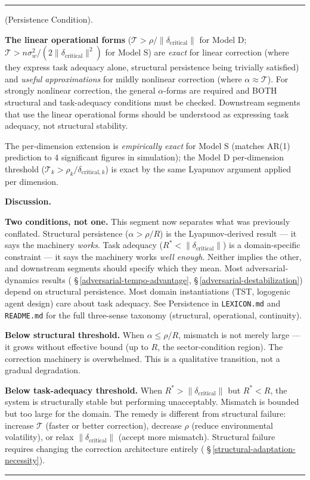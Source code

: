 \documentclass[11pt,oneside]{article}
\newcounter{claim}[section]
\renewcommand{\theclaim}{\thesection.\arabic{claim}}
\newenvironment{segment}[2]{%
  \refstepcounter{claim}%
  \bigskip\noindent\hrule\smallskip
  \noindent{\bfseries #1~\theclaim}\enskip(#2).\par\smallskip
  \noindent\ignorespaces
}{%
  \par\smallskip\noindent\hrule\bigskip
}
\newenvironment{theorem}[1][]{\begin{segment}{Theorem}{#1}}{\end{segment}}
\begin{document}
\begin{theorem}[Persistence Condition]
\textbf{The linear operational forms} ($\mathcal{T} > \rho/\lVert\delta_{\text{critical}}\rVert$ for Model D; $\mathcal{T} > n\sigma_w^2/(2\lVert\delta_{\text{critical}}\rVert^2)$ for Model S) are \textit{exact} for linear correction (where they express task adequacy alone, structural persistence being trivially satisfied) and \textit{useful approximations} for mildly nonlinear correction (where $\alpha \approx \mathcal{T}$). For strongly nonlinear correction, the general $\alpha$-forms are required and BOTH structural and task-adequacy conditions must be checked. Downstream segments that use the linear operational forms should be understood as expressing task adequacy, not structural stability.

The per-dimension extension is \textit{empirically exact} for Model S (matches AR(1) prediction to 4 significant figures in simulation); the Model D per-dimension threshold ($\mathcal{T}_k > \rho_k/\delta_{\text{critical},k}$) is exact by the same Lyapunov argument applied per dimension.


\medskip\noindent\textbf{Discussion.}


\textbf{Two conditions, not one.} This segment now separates what was previously conflated. Structural persistence ($\alpha > \rho/R$) is the Lyapunov-derived result — it says the machinery \textit{works}. Task adequacy ($R^* < \lVert\delta_{\text{critical}}\rVert$) is a domain-specific constraint — it says the machinery works \textit{well enough}. Neither implies the other, and downstream segments should specify which they mean. Most adversarial-dynamics results ( \S\,\ref{adversarial-tempo-advantage}, \S\,\ref{adversarial-destabilization}) depend on structural persistence. Most domain instantiations (TST, logogenic agent design) care about task adequacy. See Persistence in \texttt{LEXICON.md} and \texttt{README.md} for the full three-sense taxonomy (structural, operational, continuity).

\textbf{Below structural threshold.} When $\alpha \leq \rho / R$, mismatch is not merely large — it grows without effective bound (up to $R$, the sector-condition region). The correction machinery is overwhelmed. This is a qualitative transition, not a gradual degradation.

\textbf{Below task-adequacy threshold.} When $R^* > \lVert\delta_{\text{critical}}\rVert$ but $R^* < R$, the system is structurally stable but performing unacceptably. Mismatch is bounded but too large for the domain. The remedy is different from structural failure: increase $\mathcal{T}$ (faster or better correction), decrease $\rho$ (reduce environmental volatility), or relax $\lVert\delta_{\text{critical}}\rVert$ (accept more mismatch). Structural failure requires changing the correction architecture entirely ( \S\,\ref{structural-adaptation-necessity}).


\end{theorem}
\end{document}
